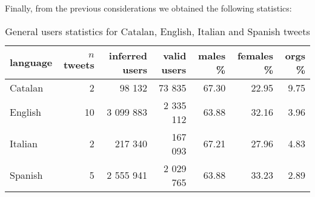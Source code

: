 Finally, from the previous considerations we obtained the following statistics:

\begin{table}[h]
	\centering
	\begin{tabular}{lrrrrrr}
		\toprule
		\textbf{language} & \textbf{\(n\) tweets} & \textbf{inferred users} & \textbf{valid users} & \textbf{males \%} & \textbf{females \%} & \textbf{orgs \%}
		\\
		\midrule
		Catalan & 2 & 98 132 & 73 835 & 67.30 & 22.95 & 9.75
		\\
		English & 10 & 3 099 883 & 2 335 112 & 63.88 & 32.16 & 3.96 
		\\
		Italian & 2 & 217 340 & 167 093 & 67.21 & 27.96 & 4.83 
		\\
		Spanish & 5 & 2 555 941 & 2 029 765 & 63.88 & 33.23 & 2.89 
		\\
		\bottomrule
	\end{tabular}
	\caption{General users statistics for Catalan, English, Italian and Spanish tweets}
	\label{tab:users-languages}
\end{table}
